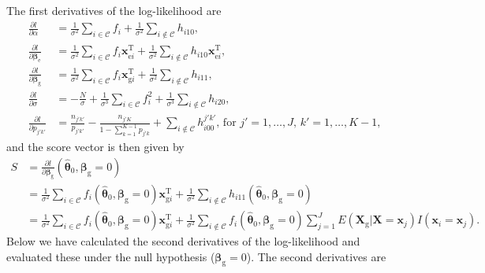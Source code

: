 \documentclass[10pt,a4paper]{article}
\def\bbetag{\bm{\beta}_{\text{g}}}
\def\bbetae{\bm{\beta}_{\text{e}}}
\def\bx{\mathbf{x}}
\def\bX{\mathbf{X}}
\def\bxgi{\mathbf{x}_{\text{g}i}}
\def\bxei{\mathbf{x}_{\text{e}i}}
\def\bXg{\mathbf{X}_{\text{g}}}
\begin{document}
The first derivatives of the log-likelihood are
\begin{align*}
\frac{\partial l}{\partial \alpha} 
&= \frac{1}{\sigma^2}\sum_{i \in \mathcal{C}} f_i + \frac{1}{\sigma^2} \sum_{i \not \in \mathcal{C}} h_{i10}, \\
\frac{\partial l}{\partial \bbetae} 
&= \frac{1}{\sigma^2}\sum_{i \in \mathcal{C}} f_i \bxei^{\text{T}} + \frac{1}{\sigma^2} \sum_{i \not \in \mathcal{C}} h_{i10} \bxei^{\text{T}}, \\
\frac{\partial l}{\partial \bbetag} 
&= \frac{1}{\sigma^2}\sum_{i \in \mathcal{C}} f_i \bxgi^{\text{T}} + \frac{1}{\sigma^2} \sum_{i \not \in \mathcal{C}} h_{i11}, \\
\frac{\partial l}{\partial \sigma} 
&= -\frac{N}{\sigma} + \frac{1}{\sigma^3}\sum_{i \in \mathcal{C}}f_i^2  + \frac{1}{\sigma^3}\sum_{i \not \in \mathcal{C}} h_{i20}, \\
\frac{\partial l}{\partial p_{j'k'}} 
&=  \frac{n_{j'k'}}{p_{j'k'}} - \frac{n_{j' K}}{1- \sum_{k=1}^{K-1}p_{j'k}}   + \sum_{i \not \in \mathcal{C}} h_{i00}^{j'k'} \text{, for } j'=1,\ldots,J \text{, } k' = 1,\ldots,K-1,
\end{align*}
and the score vector is then given by 
\begin{align*}
S & = \frac{\partial l}{\partial \bbetag} (\hat{\boldsymbol\theta}_0, \bbetag = 0) \\
&= \frac{1}{\sigma^2}\sum_{i \in \mathcal{C}} f_i(\hat{\boldsymbol\theta}_0, \bbetag = 0) \bxgi^{\text{T}} + \frac{1}{\sigma^2} \sum_{i \not \in \mathcal{C}} h_{i11}(\hat{\boldsymbol\theta}_0, \bbetag = 0) \\
&= \frac{1}{\sigma^2}\sum_{i \in \mathcal{C}} f_i(\hat{\boldsymbol\theta}_0, \bbetag = 0) \bxgi^{\text{T}} + \frac{1}{\sigma^2} \sum_{i \not \in \mathcal{C}} f_i(\hat{\boldsymbol\theta}_0, \bbetag = 0) \sum_{j=1}^J E(\bXg|\bX = \bx_j) I(\bx_i = \bx_j).
\end{align*}
Below we have calculated the second derivatives of the log-likelihood and evaluated these under the null hypothesis ($\bbetag=0$). The second derivatives are
\end{document}
